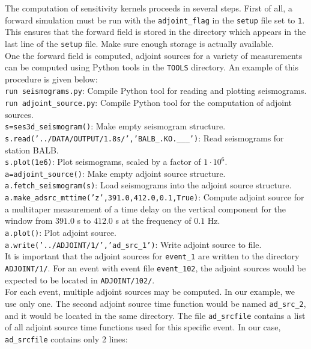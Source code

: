 The computation of sensitivity kernels proceeds in several steps. First of all, a forward simulation must be run with the \texttt{adjoint\_flag} in the \texttt{setup} file set to \texttt{1}. This ensures that the forward field is stored in the directory which appears in the last line of the \texttt{setup} file. Make sure enough storage is actually available.\\
One the forward field is computed, adjoint sources for a variety of measurements can be computed using Python tools in the \texttt{TOOLS} directory. An example of this procedure is given below:\\[5pt]
\texttt{run seismograms.py}: Compile Python tool for reading and plotting seismograms.\\[5pt]
\texttt{run adjoint\_source.py}: Compile Python tool for the computation of adjoint sources.\\[5pt]
\texttt{s=ses3d\_seismogram()}: Make empty seismogram structure.\\[5pt]
\texttt{s.read('../DATA/OUTPUT/1.8s/','BALB\_.KO.\_\_\_')}: Read seismograms for station BALB.\\[5pt]
\texttt{s.plot(1e6)}: Plot seismograms, scaled by a factor of $1\cdot 10^6$.\\[5pt]
\texttt{a=adjoint\_source()}: Make empty adjoint source structure.\\[5pt]
\texttt{a.fetch\_seismogram(s)}: Load seismograms into the adjoint source structure.\\[5pt]
\texttt{a.make\_adsrc\_mttime('z',391.0,412.0,0.1,True)}: Compute adjoint source for a multitaper measurement of a time delay on the vertical component for the window from $391.0$ s to $412.0$ s at the frequency of $0.1$ Hz.\\[5pt]
\texttt{a.plot()}: Plot adjoint source.\\[5pt]
\texttt{a.write('../ADJOINT/1/','ad\_src\_1')}: Write adjoint source to file.\\[5pt]
It is important that the adjoint sources for \texttt{event\_1} are written to the directory \texttt{ADJOINT/1/}. For an event with event file \texttt{event\_102}, the adjoint sources would be expected to be located in \texttt{ADJOINT/102/}.\\
For each event, multiple adjoint sources may be computed. In our example, we use only one. The second adjoint source time function would be named \texttt{ad\_src\_2}, and it would be located in the same directory. The file \texttt{ad\_srcfile} contains a list of all adjoint source time functions used for this specific event. In our case, \texttt{ad\_srcfile} contains only 2 lines:\\[7pt]
